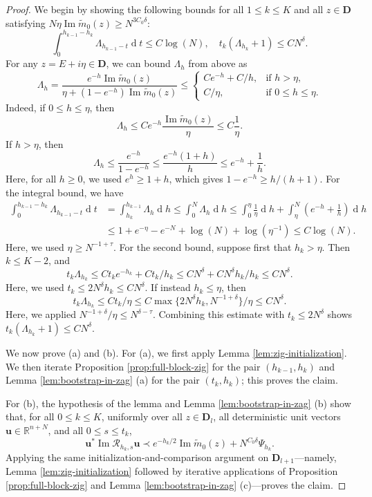 \documentclass[11pt,reqno]{amsart}
\def\R{\mathbb{R}}
\def\u{\mathbf{u}}
\def\cR{\mathcal{R}}
\def\bD{\mathbf{D}}
\def\de{\operatorname{d}}
\def\Im{\operatorname{Im}}
\theoremstyle{definition}
\numberwithin{equation}{section}
\numberwithin{figure}{section}
\begin{document}
\begin{proof}
We begin by showing the following bounds for all $1\leq k\leq K$ and all $z\in\bD$ satisfying $N\eta\Im\widetilde m_0(z)\geq N^{3C_0\delta}$:
\[
    \int_0^{h_{k-1}-h_k}\Lambda_{h_{k-1}-t}\de t\leq C\log(N),\quad t_k(\Lambda_{h_k}+1)\leq CN^\delta.
\]
For any $z=E+i\eta\in\bD$, we can bound $\Lambda_h$ from above as
\[
    \Lambda_h=\frac{e^{-h}\Im\widetilde m_0(z)}{\eta+(1-e^{-h})\Im\widetilde m_0(z)}\leq \begin{cases}
        Ce^{-h}+C/h, & \text{if $h>\eta$,}\\
        C/\eta, & \text{if $0\leq h\leq\eta$}.
    \end{cases}
\]
Indeed, if $0\leq h\leq \eta$, then
\[
    \Lambda_h\leq Ce^{-h}\frac{\Im\widetilde m_0(z)}{\eta}\leq C\frac{1}{\eta}.
\]
If $h>\eta$, then
\[
    \Lambda_h\leq \frac{e^{-h}}{1-e^{-h}}\leq \frac{e^{-h}(1+h)}{h}\leq e^{-h}+\frac{1}{h}.
\]
Here, for all $h\geq 0$, we used $e^h\geq 1+h$, which gives $1-e^{-h}\geq h/(h+1)$. For the integral bound, we have
\begin{align*}
    \int_0^{h_{k-1}-h_k}\Lambda_{h_{k-1}-t}\de t&=\int_{h_k}^{h_{k-1}}\Lambda_{h}\de h\leq \int_0^{N}\Lambda_h\de h\leq\int_0^{\eta}\frac{1}{\eta}\de h+\int_{\eta}^{N}\left(e^{-h}+\frac{1}{h}\right)\de h\\
    &\leq 1+e^{-\eta}-e^{-N}+\log(N)+\log(\eta^{-1})\leq C\log(N) .
\end{align*}
Here, we used $\eta\geq N^{-1+\tau}$. For the second bound, suppose first that $h_k>\eta$. Then $k\leq K-2$, and
\[
    t_k\Lambda_{h_k}\leq Ct_ke^{-h_k}+Ct_k/h_k\leq CN^\delta+CN^\delta h_k/h_k\leq CN^\delta .
\]
Here, we used $t_k\leq 2N^\delta h_k\leq CN^\delta$. If instead $h_k\leq \eta$, then
\[
    t_k\Lambda_{h_k}\leq Ct_k/\eta\leq C\max\{2N^\delta h_k,N^{-1+\delta}\}/\eta\leq CN^\delta .
\]
Here, we applied $N^{-1+\delta}/\eta\leq N^{\delta-\tau}$. Combining this estimate with $t_k\leq 2N^\delta$ shows $t_k(\Lambda_{h_k}+1)\leq CN^\delta$.

We now prove (a) and (b). For (a), we first apply Lemma \ref{lem:zig-initialization}. We then iterate Proposition \ref{prop:full-block-zig} for the pair $(h_{k-1},h_k)$ and Lemma \ref{lem:bootstrap-in-zag} (a) for the pair $(t_k,h_k)$; this proves the claim.

For (b), the hypothesis of the lemma and Lemma \ref{lem:bootstrap-in-zag} (b) show that, for all $0\leq k\leq K$, uniformly over all $z\in\bD_l$, all deterministic unit vectors $\u\in\R^{n+N}$, and all $0\leq s\leq t_k$,
\[
    \u^*\Im\cR_{h_k,s}\u\prec e^{-h_k/2}\Im\widetilde m_0(z)+N^{C_0\delta}\Psi_{h_k}.
\]
Applying the same initialization-and-comparison argument on $\bD_{l+1}$---namely, Lemma \ref{lem:zig-initialization} followed by iterative applications of Proposition \ref{prop:full-block-zig} and Lemma \ref{lem:bootstrap-in-zag} (c)---proves the claim.
\end{proof}
\end{document}
